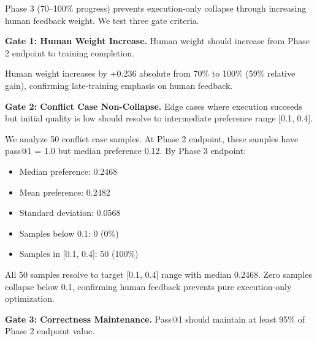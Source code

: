 Phase 3 (70--100\% progress) prevents execution-only collapse through increasing human feedback weight. We test three gate criteria.

\textbf{Gate 1: Human Weight Increase.} Human weight should increase from Phase 2 endpoint to training completion.

\begin{table}[htbp]
\centering
{}
\end{table}

Human weight increases by +0.236 absolute from 70\% to 100\% (59\% relative gain), confirming late-training emphasis on human feedback.

\textbf{Gate 2: Conflict Case Non-Collapse.} Edge cases where execution succeeds but initial quality is low should resolve to intermediate preference range [0.1, 0.4].

We analyze 50 conflict case samples. At Phase 2 endpoint, these samples have pass@1 = 1.0 but median preference 0.12. By Phase 3 endpoint:

\begin{itemize}
\item Median preference: 0.2468
\item Mean preference: 0.2482
\item Standard deviation: 0.0568
\item Samples below 0.1: 0 (0\%)
\item Samples in [0.1, 0.4]: 50 (100\%)
\end{itemize}

All 50 samples resolve to target [0.1, 0.4] range with median 0.2468. Zero samples collapse below 0.1, confirming human feedback prevents pure execution-only optimization.

\textbf{Gate 3: Correctness Maintenance.} Pass@1 should maintain at least 95\% of Phase 2 endpoint value.

\begin{table}[htbp]
\centering
{}
\end{table}


